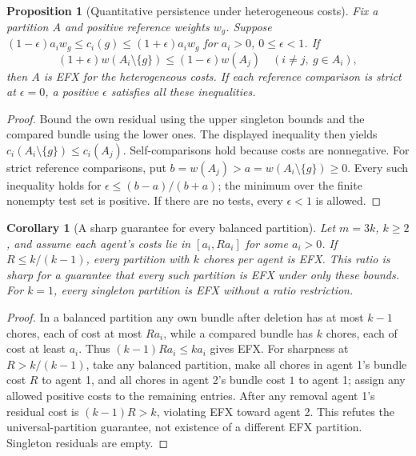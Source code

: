 \documentclass[11pt]{article}
\newtheorem{proposition}[theorem]{Proposition}
\newtheorem{corollary}[theorem]{Corollary}
\theoremstyle{definition}
\begin{document}
\begin{proposition}[Quantitative persistence under heterogeneous costs]
Fix a partition $A$ and positive reference weights $w_g$. Suppose
$(1-\epsilon)a_iw_g\leq c_i(g)\leq(1+\epsilon)a_iw_g$
for $a_i>0$, $0\leq\epsilon<1$. If
\[
 (1+\epsilon)w(A_i\setminus\{g\})
 \leq(1-\epsilon)w(A_j)
 \quad(i\ne j,\ g\in A_i),
\]
then $A$ is EFX for the heterogeneous costs. If each reference comparison is
strict at $\epsilon=0$, a positive $\epsilon$ satisfies all these inequalities.
\end{proposition}
\begin{proof}
Bound the own residual using the upper singleton bounds and the compared
bundle using the lower ones. The displayed inequality then yields
$c_i(A_i\setminus\{g\})\leq c_i(A_j)$. Self-comparisons hold because costs
are nonnegative. For strict reference comparisons, put
$b=w(A_j)>a=w(A_i\setminus\{g\})\geq0$. Every such inequality holds for
$\epsilon\leq(b-a)/(b+a)$; the minimum over the finite nonempty test set
is positive. If there are no tests, every $\epsilon<1$ is allowed.
\end{proof}

\begin{corollary}[A sharp guarantee for every balanced partition]
Let $m=3k$, $k\geq2$, and assume each agent's costs lie in
$[a_i,R a_i]$ for some $a_i>0$. If $R\leq k/(k-1)$, every partition with
$k$ chores per agent is EFX. This ratio is sharp for a guarantee that
\emph{every} such partition is EFX under only these bounds.
For $k=1$, every singleton partition is EFX without a ratio restriction.
\end{corollary}
\begin{proof}
In a balanced partition any own bundle after deletion has at most $k-1$
chores, each of cost at most $Ra_i$, while a compared bundle has $k$ chores,
each of cost at least $a_i$. Thus $(k-1)Ra_i\leq ka_i$ gives EFX.
For sharpness at $R>k/(k-1)$, take any balanced partition, make all chores
in agent 1's bundle cost $R$ to agent 1, and all chores in agent 2's bundle
cost $1$ to agent 1; assign any allowed positive costs to the remaining
entries. After any removal agent 1's residual cost is $(k-1)R>k$,
violating EFX toward agent 2. This refutes the universal-partition guarantee,
not existence of a different EFX partition. Singleton residuals are empty.
\end{proof}
\end{document}
